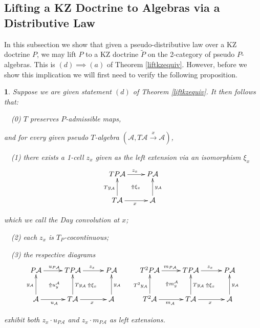 \documentclass[a4paper,oneside,english]{amsart}
\numberwithin{equation}{section}
\numberwithin{figure}{section}
\theoremstyle{plain}
\theoremstyle{definition}
\theoremstyle{remark}
\theoremstyle{definition}
\theoremstyle{plain}
\newtheorem{prop}[thm]{\protect\propositionname}
\theoremstyle{plain}
\theoremstyle{plain}
\providecommand{\propositionname}{Proposition}
\begin{document}
\subsection{Lifting a KZ Doctrine to Algebras via a Distributive Law}

In this subsection we show that given a pseudo-distributive law over
a KZ doctrine $P$, we may lift $P$ to a KZ doctrine $\widetilde{P}$
on the 2-category of pseudo $P$-algebras. This is $\left(d\right)\implies\left(a\right)$
of Theorem \ref{liftkzequiv}. However, before we show this implication
we will first need to verify the following proposition.
\begin{prop}
\label{claim} Suppose we are given statement $\left(d\right)$ of
Theorem \ref{liftkzequiv}. It then follows that:

$\quad$(0) $T$ preserves $P$-admissible maps, 

\noindent and for every given pseudo $T$-algebra $\left(\mathcal{A},T\mathcal{A}\overset{x}{\rightarrow}\mathcal{A}\right)$, 

$\quad$(1) there exists a 1-cell $z_{x}$ given as the left extension
via an isomorphism $\xi_{x}$ 
\[
\xymatrix{TP\mathcal{A}\ar[r]^{z_{x}} & P\mathcal{A}\\
T\mathcal{A}\ar[r]_{x}\ar[u]^{Ty_{\mathcal{A}}}\ar@{}[ur]|-{\Uparrow\xi_{x}} & \mathcal{A}\ar[u]_{y_{\mathcal{A}}}
}
\]

which we call the Day convolution at $x$;

$\quad$(2) each $z_{x}$ is $T_{P}$-cocontinuous;

$\quad$(3) the respective diagrams
\[
\xymatrix@=1em{P\mathcal{A}\ar[rr]^{u_{P\mathcal{A}}} &  & TP\mathcal{A}\ar@{}[dldl]|-{\Uparrow u_{y}^{\mathcal{A}}}\ar[rr]^{z_{x}}\ar@{}[ddrr]|-{\Uparrow\xi_{x}} &  & P\mathcal{A} &  & T^{2}P\mathcal{A}\ar[rr]^{m_{P\mathcal{A}}} &  & TP\mathcal{A}\ar@{}[dldl]|-{\Uparrow m_{y}^{\mathcal{A}}}\ar[rr]^{z_{x}}\ar@{}[ddrr]|-{\Uparrow\xi_{x}} &  & P\mathcal{A}\\
 &  &  & \; &  &  &  &  &  & \;\\
\mathcal{A}\ar[rr]_{u_{\mathcal{A}}}\ar[uu]^{y_{\mathcal{A}}} &  & T\mathcal{A}\ar[uu]_{Ty_{\mathcal{A}}}\ar[rr]_{x} &  & \mathcal{A}\ar[uu]_{y_{\mathcal{A}}} &  & T^{2}\mathcal{A}\ar[rr]_{m_{\mathcal{A}}}\ar[uu]^{T^{2}y_{\mathcal{A}}} &  & T\mathcal{A}\ar[uu]_{Ty_{\mathcal{A}}}\ar[rr]_{x} &  & \mathcal{A}\ar[uu]_{y_{\mathcal{A}}}
}
\]

exhibit both $z_{x}\cdot u_{P\mathcal{A}}$ and $z_{x}\cdot m_{P\mathcal{A}}$
as left extensions. \end{prop}
\end{document}
